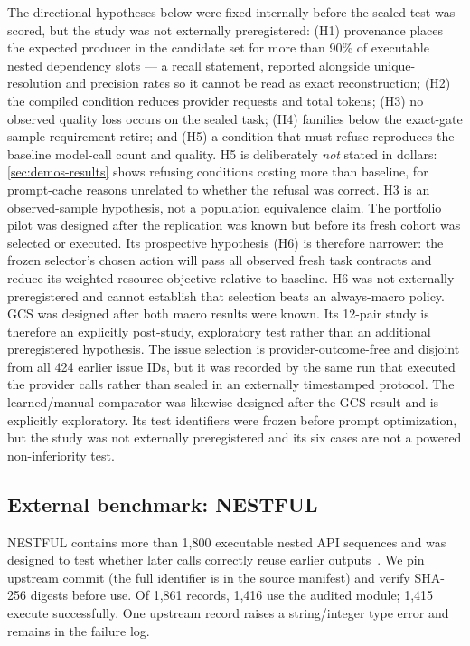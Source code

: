 The directional hypotheses below were fixed internally before the sealed test was scored, but the study was not externally preregistered: (H1) provenance places the expected producer in the
candidate set for more than 90\% of executable nested dependency slots --- a recall
statement, reported alongside unique-resolution and precision rates so it cannot be read
as exact reconstruction; (H2) the compiled condition reduces provider requests and total
tokens; (H3) no observed quality loss occurs on the sealed task; (H4) families below
the exact-gate sample requirement retire; and (H5) a condition that must refuse
reproduces the baseline model-call count and quality.  H5 is deliberately \emph{not}
stated in dollars: \cref{sec:demos-results} shows refusing conditions costing more than
baseline, for prompt-cache reasons unrelated to whether the refusal was correct.  H3 is an observed-sample hypothesis,
not a population equivalence claim.
The portfolio pilot was designed after the replication was known but before its fresh
cohort was selected or executed.  Its prospective hypothesis (H6) is therefore narrower:
the frozen selector's chosen action will pass all observed fresh task contracts and reduce
its weighted resource objective relative to baseline.  H6 was not externally preregistered
and cannot establish that selection beats an always-macro policy.
GCS was designed after both macro results were known.  Its 12-pair study is therefore an
explicitly post-study, exploratory test rather than an additional preregistered hypothesis.
The issue selection is provider-outcome-free and disjoint from all 424 earlier issue IDs,
but it was recorded by the same run that executed the provider calls rather than sealed in
an externally timestamped protocol.
The learned/manual comparator was likewise designed after the GCS result and is explicitly
exploratory.  Its test identifiers were frozen before prompt optimization, but the study
was not externally preregistered and its six cases are not a powered non-inferiority test.

\subsection{External benchmark: NESTFUL}

NESTFUL contains more than 1,800 executable nested API sequences and was designed to test
whether later calls correctly reuse earlier outputs~\cite{basu2025nestful}.  We pin
upstream commit  (the full identifier is in the source manifest) and
verify SHA-256 digests before use.  Of 1,861 records, 1,416 use the audited 
module; 1,415 execute successfully.  One upstream record raises a string/integer type
error and remains in the failure log.

